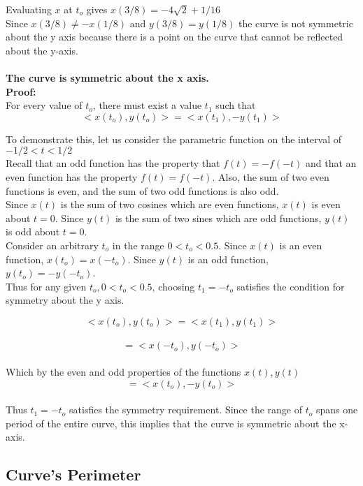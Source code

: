 \documentclass[a4paper,10pt]{scrartcl}
\begin{document}
Evaluating $x$ at $t_o$ gives $x(3/8) = -4\sqrt{2} + 1/16$ \\

Since $x(3/8) \neq -x(1/8)$ and $y(3/8) = y(1/8)$ the curve is not symmetric about the y axis because there is a point on the curve that
cannot be reflected about the y-axis.\\\\


{\bfseries The curve is symmetric about the x axis.}\\

{\bfseries Proof:}\\

For every value of $t_o$, there must exist a value $t_1$ such that  
\[ <x(t_o), y(t_o)> = <x(t_1), -y(t_1)>\]

To demonstrate this, let us consider the parametric function on the interval of \\$-1/2 < t < 1/2$\\

Recall that an odd function has the property that $f(t) = -f(-t)$ and that an even
function has the property $f(t) = f(-t)$. Also, the sum of two even functions is even, and the sum of
two odd functions is also odd.\\

Since $x(t)$ is the sum of two cosines which are even functions, $x(t)$ is even about $t = 0$.
Since $y(t)$ is the sum of two sines which are odd functions, $y(t)$ is odd about $t = 0$.\\

Consider an arbitrary $t_o$ in the range $0 < t_o < 0.5$. Since $x(t)$ is an even function, $x(t_o) = x(-t_o)$.
Since $y(t)$ is an odd function, $y(t_o) = -y(-t_o)$. \\

Thus for any given $t_o, 0 < t_o < 0.5$, choosing $t_1 = -t_o$ satisfies the condition for symmetry about the y axis.

\[ <x(t_o), y(t_o)> = <x(t_1), y(t_1)>\]\\
\[ = <x(-t_o), y(-t_o)>\]\\
Which by the even and odd properties of the functions $x(t), y(t)$ \\ 
\[ = <x(t_o), -y(t_o)>\]\\

Thus $t_1 = -t_o$ satisfies the symmetry requirement. Since the range of $t_o$ spans one period of the entire curve, this implies that the curve is symmetric about the x-axis.
\subsection{Curve's Perimeter}
\end{document}

